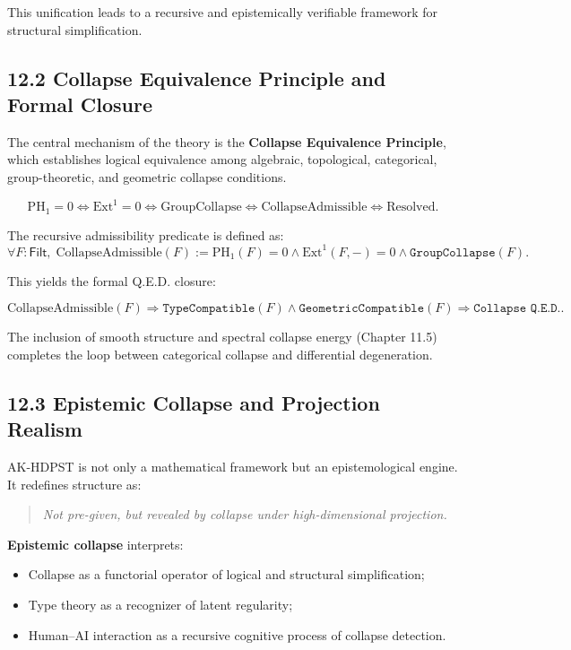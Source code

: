 \documentclass[11pt]{article}
\begin{document}
This unification leads to a recursive and epistemically verifiable framework for structural simplification.

\subsection*{12.2 Collapse Equivalence Principle and Formal Closure}

The central mechanism of the theory is the \textbf{Collapse Equivalence Principle}, which establishes logical equivalence among algebraic, topological, categorical, group-theoretic, and geometric collapse conditions.

\[
\mathrm{PH}_1 = 0 \iff \mathrm{Ext}^1 = 0 \iff \text{GroupCollapse} \iff \text{CollapseAdmissible} \iff \text{Resolved}.
\]

The recursive admissibility predicate is defined as:
\[
\forall F : \mathsf{Filt},\;
\mathrm{CollapseAdmissible}(F) := \mathrm{PH}_1(F) = 0 \wedge \mathrm{Ext}^1(F, -) = 0 \wedge \texttt{GroupCollapse}(F).
\]

This yields the formal Q.E.D. closure:

\[
\mathrm{CollapseAdmissible}(F) \Rightarrow \texttt{TypeCompatible}(F) \wedge \texttt{GeometricCompatible}(F) \Rightarrow \boxed{\texttt{Collapse Q.E.D.}}.
\]

The inclusion of smooth structure and spectral collapse energy (Chapter 11.5) completes the loop between categorical collapse and differential degeneration.

\subsection*{12.3 Epistemic Collapse and Projection Realism}

AK-HDPST is not only a mathematical framework but an epistemological engine. It redefines structure as:
\begin{quote}
\textit{Not pre-given, but revealed by collapse under high-dimensional projection.}
\end{quote}

\textbf{Epistemic collapse} interprets:
\begin{itemize}
    \item Collapse as a functorial operator of logical and structural simplification;
    \item Type theory as a recognizer of latent regularity;
    \item Human–AI interaction as a recursive cognitive process of collapse detection.
\end{itemize}
\end{document}
